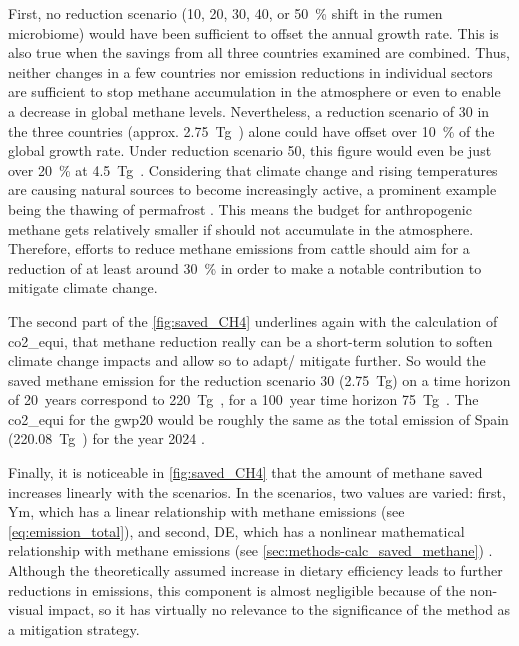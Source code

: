 First, no reduction scenario (10, 20, 30, 40, or 50~\% shift in the rumen microbiome) would have been sufficient to offset the annual growth rate. This is also true when the savings from all three countries examined are combined. Thus, neither changes in a few countries nor emission reductions in individual sectors are sufficient to stop methane accumulation in the atmosphere or even to enable a decrease in global methane levels. Nevertheless, a reduction scenario of 30 in the three countries (approx. 2.75~Tg~) alone could have offset over 10~\% of the global growth rate. Under reduction scenario 50, this figure would even be just over 20~\% at 4.5~Tg~.
Considering that climate change and rising temperatures are causing natural  sources to become increasingly active, a prominent example being the thawing of permafrost \parencite{schadelPermafrostWildfireCarbon2026, saunoisGlobalMethaneBudget2025, turetskyCarbonReleaseAbrupt2020}. This means the budget for anthropogenic methane gets relatively smaller if  should not accumulate in the atmosphere. Therefore, efforts to reduce methane emissions from cattle should aim for a reduction of at least around 30~\% in order to make a notable contribution to mitigate climate change. 

The second part of the \cref{fig:saved_CH4} underlines again with the calculation of \acrshort{co2_equi}, that methane reduction really can be a short-term solution to soften climate change impacts and allow so to adapt/ mitigate further. So would the saved methane emission for the reduction scenario 30 (2.75~Tg) on a time horizon of 20~years correspond to 220~Tg~, for a 100~year time horizon 75~Tg~. The \acrshort{co2_equi} for the \acrshort{gwp}20 would be roughly the same as the total  emission of Spain (220.08~Tg~) for the year 2024 \parencite{europeancommission.jointresearchcentre.GHGEmissionsAll2025}.

Finally, it is noticeable in \cref{fig:saved_CH4} that the amount of methane saved increases linearly with the scenarios. In the scenarios, two values are varied: first, \acrfull{Ym}, which has a linear relationship with methane emissions (see \cref{eq:emission_total}), and second, \acrfull{DE}, which has a nonlinear mathematical relationship with methane emissions (see \cref{sec:methods-calc_saved_methane}) . Although the theoretically assumed increase in dietary efficiency leads to further reductions in  emissions, this component is almost negligible because of the non-visual impact, so it has virtually no relevance to the significance of the method as a mitigation strategy.\\

